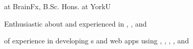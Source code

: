 

\begin{cvparagraph}
        \begin{summaryitems}
            \item {} at BrainFx, B.Sc. Hons.  at YorkU
            \item Enthusiastic about and experienced in , ,  and 
            \item {} of experience in developing s and web apps using , , , ,  and 
        \end{summaryitems}
\end{cvparagraph}



